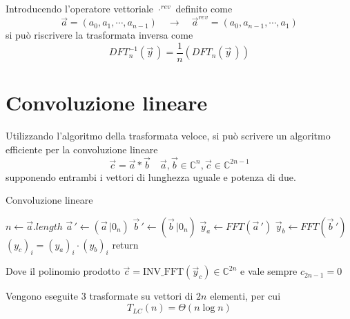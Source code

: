 Introducendo l'operatore vettoriale $\cdot^{rev}$ definito come
\begin{equation*}
    \vec{a} = \left( a_0, a_1, \cdots, a_{n-1} \right)
    \quad \rightarrow \quad
    \vec{a}^{rev} = \left( a_0, a_{n-1}, \cdots, a_1 \right)
\end{equation*}
si può riscrivere la trasformata inversa come
\begin{equation*}
    DFT_{n}^{-1} \left( \vec{y} \, \right) = \frac{1}{n} \left( DFT_{n} \left( \vec{y} \, \right) \right)
\end{equation*}

\section{Convoluzione lineare}

Utilizzando l'algoritmo della trasformata veloce, si può scrivere un algoritmo efficiente per la convoluzione lineare
\begin{equation*}
    \vec{c} = \vec{a} * \vec{b}
    \quad
    \vec{a}, \vec{b} \in \mathbb{C}^n, \vec{c} \in \mathbb{C}^{2n-1}
\end{equation*}
supponendo entrambi i vettori di lunghezza uguale e potenza di due.

\begin{algorithm}[H]
\caption{Convoluzione lineare}\label{alg:convlin}
\begin{algorithmic}[1]
        \State $n \gets \vec{a}.length$
        \State $\vec{a}\,' \gets \left( \vec{a} \, | 0_n \right)$
        \State $\vec{b}\,' \gets \left( \vec{b} \, | 0_n \right)$
        \State $\vec{y}_a \gets FFT \left( \vec{a}\,' \right)$
        \State $\vec{y}_b \gets FFT \left( \vec{b}\,' \right)$
        \State $ \left( y_c \right)_i = \left( y_a \right)_i \cdot \left( y_b \right)_i $
        \EndFor
        \State return 
    \EndProcedure
\end{algorithmic}
\end{algorithm}

Dove il polinomio prodotto $\vec{c} = \text{INV\_FFT}\left( \vec{y}_c \right) \in \mathbb{C}^{2n}$ e vale sempre $c_{2n-1}=0$

Vengono eseguite $3$ trasformate su vettori di $2n$ elementi, per cui
\begin{equation*}
    T_{LC} (n) = \Theta \left( n \log n \right)
\end{equation*}


